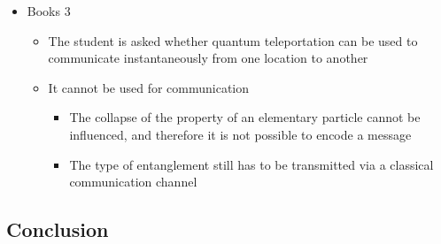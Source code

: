 \documentclass[11pt,twoside]{report} %
\begin{document}
\begin{itemize}
\begin{itemize}
	\end{itemize}
	\item Books 3
	\begin{itemize}
		\item The student is asked whether quantum teleportation can be used to communicate instantaneously from one location to another
		\item It cannot be used for communication
		\begin{itemize}
			\item The collapse of the property of an elementary particle cannot be influenced, and therefore it is not possible to encode a message
			\item The type of entanglement still has to be transmitted via a classical communication channel
		\end{itemize}
	\end{itemize}
\end{itemize}

\subsection{Conclusion}
\end{document}
